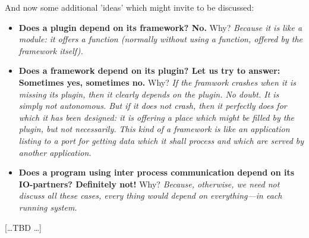 {And now some additional 'ideas' which might invite to be discussed:

\begin{itemize}
  \item \textbf{Does a plugin depend on its framework? No.} Why? \emph{
  Because it is like a module: it offers a function (normally without using
  a function, offered by the framework itself).}
  \item \textbf{Does a framework depend on its plugin? Let us try to answer:
  Sometimes yes, sometimes no.} Why? \emph{If the framwork crashes when it is
  missing its plugin, then it clearly depends on the plugin. No doubt. It is
  simply not autonomous. But if it does not crash, then it perfectly does for
  which it has been designed: it is offering a place which might be filled by
  the plugin, but not necessarily. This kind of a framework is like an
  application listing to a port for getting data which it shall process and
  which are served by another application.}
  \item \textbf{Does a program using inter process communication depend on its
  IO-partners? Definitely not!} Why? \emph{Because, otherwise, we need not discuss
  all these cases, every thing would depend on everything---in each running system.}
\end{itemize}

[\ldots TBD \ldots]

}
%
